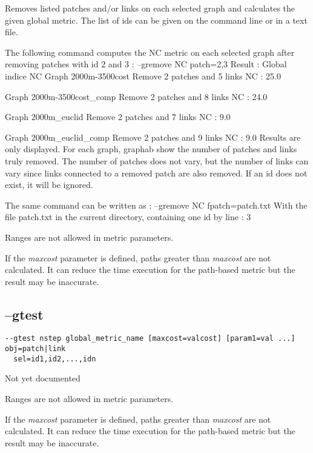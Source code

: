 \documentclass[a4paper,10pt]{report}
\newenvironment{cmd}
{\quote\Verbatim}
{\endVerbatim\endquote}
\begin{document}
Removes listed patches and/or links on each selected graph and calculates the given global metric.
The list of ids can be given on the command line or in a text file.

The following command computes the NC metric on each selected graph after removing patches with id 2 and 3 :
\begin{cmd}
--gremove NC patch=2,3
\end{cmd}
Result : 
\begin{cmd}
Global indice NC
Graph 2000m-3500cost
Remove 2 patches and 5 links
NC : 25.0

Graph 2000m-3500cost_comp
Remove 2 patches and 8 links
NC : 24.0

Graph 2000m_euclid
Remove 2 patches and 7 links
NC : 9.0

Graph 2000m_euclid_comp
Remove 2 patches and 9 links
NC : 9.0
\end{cmd}
Results are only displayed.
For each graph, graphab show the number of patches and links truly removed. The number of patches does not vary, but the number of links can vary since links connected to a removed patch are also removed. If an id does not exist, it will be ignored.

The same command can be written as :
\begin{cmd}
--gremove NC fpatch=patch.txt
\end{cmd}
With the file patch.txt in the current directory, containing one id by line :
\begin{cmd}
2
3
\end{cmd}

Ranges are not allowed in metric parameters.

If the \textit{maxcost} parameter is defined, paths greater than \textit{maxcost} are not calculated. It can reduce the time execution for the path-based metric but the result may be inaccurate.

\subsection{--gtest}
\begin{verbatim}
--gtest nstep global_metric_name [maxcost=valcost] [param1=val ...] obj=patch|link 
  sel=id1,id2,...,idn
\end{verbatim}

Not yet documented

Ranges are not allowed in metric parameters.

If the \textit{maxcost} parameter is defined, paths greater than \textit{maxcost} are not calculated. It can reduce the time execution for the path-based metric but the result may be inaccurate.
\end{document}
